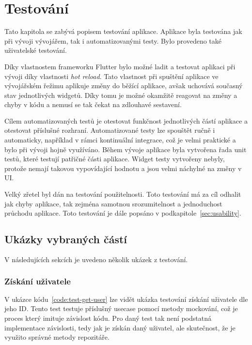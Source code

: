 \chapter{Testování}
\label{chap:testing}

Tato kapitola se zabývá popisem testování aplikace.
Aplikace byla testována jak při vývoji vývojářem,
tak i automatizovanými testy.
Bylo provedeno také uživatelské testování.

Díky vlastnostem frameworku Flutter bylo možné ladit a testovat aplikaci
při vývoji díky vlastnosti \emph{hot reload}.
Tato vlastnost při spuštění aplikace ve vývojářském řežimu
aplikuje změny do běžící aplikace,
avšak uchovává současný stav jednotlivých widgetů.
Díky tomu je možné okamžitě reagovat na změny a chyby v kódu
a nemusí se tak čekat na zdlouhavé sestavení.

Cílem automatizovaných testů je otestovat funkčnost jednotlivých částí aplikace
a otestovat příslušné rozhraní.
Automatizované testy lze spouštět ručně i automaticky,
například v rámci kontinuální integrace,
což je velmi praktické a bylo při vývoji hojně využíváno.
Během vývoje aplikace byla vytvořena řada unit testů,
které testují patřičné části aplikace.
Widget testy vytvořeny nebyly,
protože nemají takovou vypovídající hodnotu a jsou velmi náchylné na změny v UI.

Velký zřetel byl dán na testování použitelnosti.
Toto testování má za cíl odhalit jak chyby aplikace,
tak zejména samotnou srozumitelnost a jednoduchost průchodu aplikace.
Toto testování je dále popsáno v podkapitole~\ref{sec:usability}.

\section{Ukázky vybraných částí}

V následujících sekcích je uvedeno několik ukázek z testování.

\subsection{Získání uživatele}

V ukázce kódu~\ref{code:test-get-user} lze vidět ukázka testování získání
uživatele dle jeho ID.
Tento test testuje příslušný usecase pomocí metody mockování,
což je proces který imituje závislost kódu.
Pro daný test tak není podstatná implementace závislosti,
tedy jak je získán daný uživatel,
ale skutečnost,
že je využito správné metody repozitáře.

